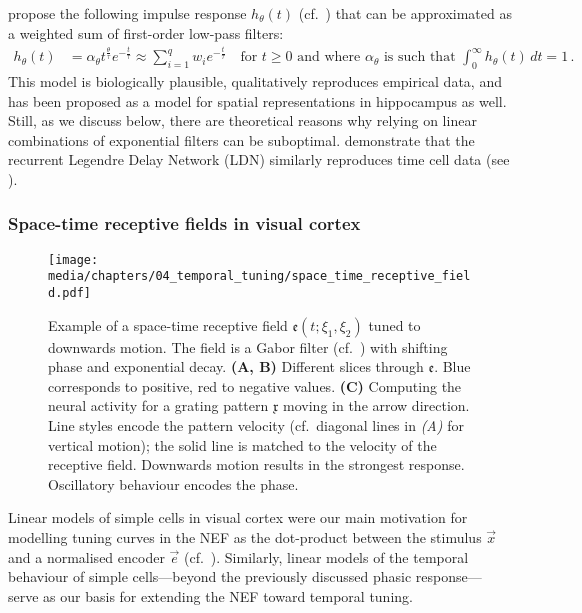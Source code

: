 \citet{howard2014unified} propose the following impulse response $h_\theta(t)$ (cf.~) that can be approximated as a weighted sum of first-order low-pass filters:
\begin{align*}
	h_\theta(t)
	&=
		\alpha_\theta t^{\frac{\theta}{\tau}} e^{-\frac{t}{\tau}}
	\approx
		\sum_{i = 1}^q w_i e^{-\frac{t}{\tau}}
	\quad \text{for } t \geq 0 \text{ and where } \alpha_\theta \text{ is such that } \int_{0}^\infty h_\theta(t) \,dt = 1 \,.
\end{align*}
This model is biologically plausible, qualitatively reproduces empirical data, and has been proposed as a model for spatial representations in hippocampus as well.
Still, as we discuss below, there are theoretical reasons why relying on linear combinations of exponential filters can be suboptimal.
 demonstrate that the recurrent Legendre Delay Network (LDN) similarly reproduces time cell data (see ).

\subsubsection{Space-time receptive fields in visual cortex}

\begin{figure}
	\centering
	\texttt{[image: media/chapters/04\_temporal\_tuning/space\_time\_receptive\_field.pdf]}%
	{\label{fig:space_time_receptive_field_a}}%
	{\label{fig:space_time_receptive_field_b}}%
	{\label{fig:space_time_receptive_field_c}}%
	\caption[Example of a space-time receptive field tuned to downwards motion]{Example of a space-time receptive field $\mathfrak{e}(t; \xi_1, \xi_2)$ tuned to downwards motion. The field is a Gabor filter (cf.~) with shifting phase and exponential decay.
	\textbf{(A, B)} Different slices through $\mathfrak{e}$.
	Blue corresponds to positive, red to negative values.
	\textbf{(C)} Computing the neural activity for a grating pattern $\mathfrak{x}$ moving in the arrow direction.
	Line styles encode the pattern velocity (cf.~diagonal lines in \emph{(A)} for vertical motion); the solid line is matched to the velocity of the receptive field.
	Downwards motion results in the strongest response.
	Oscillatory behaviour encodes the phase.
	}
	\label{fig:space_time_receptive_field}
\end{figure}

Linear models of simple cells in visual cortex were our main motivation for modelling tuning curves in the NEF as the dot-product between the stimulus $\vec x$ and a normalised encoder $\vec e$ (cf.~).
Similarly, linear models of the temporal behaviour of simple cells---beyond the previously discussed phasic response---serve as our basis for extending the NEF toward temporal tuning.

